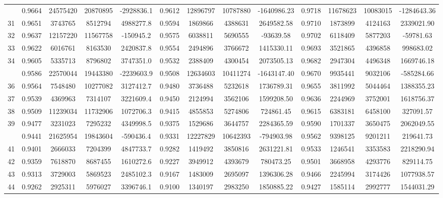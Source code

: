 \documentclass[
  12pt,
]{article}
\begin{document}
\begin{longtable}[t]{lcccccccccccc}
\addlinespace
30 & 0.9664 & 24575420 & 20870895 & -2928836.1 & 0.9612 & 12896797 & 10787880 & -1640986.23 & 0.9718 & 11678623 & 10083015 & -1284643.36\\
31 & 0.9651 & 3743765 & 8512794 & 4988277.8 & 0.9594 & 1869866 & 4388631 & 2649582.58 & 0.9710 & 1873899 & 4124163 & 2339021.90\\
32 & 0.9637 & 12157220 & 11567758 & -150945.2 & 0.9575 & 6038811 & 5690555 & -93639.58 & 0.9702 & 6118409 & 5877203 & -59781.63\\
33 & 0.9622 & 6016761 & 8163530 & 2420837.8 & 0.9554 & 2494896 & 3766672 & 1415330.11 & 0.9693 & 3521865 & 4396858 & 998683.02\\
34 & 0.9605 & 5335713 & 8796802 & 3747351.0 & 0.9532 & 2388409 & 4300454 & 2073505.13 & 0.9682 & 2947304 & 4496348 & 1669746.18\\
\addlinespace
35 & 0.9586 & 22570044 & 19443380 & -2239603.9 & 0.9508 & 12634603 & 10411274 & -1643147.40 & 0.9670 & 9935441 & 9032106 & -585284.66\\
36 & 0.9564 & 7548480 & 10277082 & 3127412.7 & 0.9480 & 3736488 & 5232618 & 1736789.31 & 0.9655 & 3811992 & 5044464 & 1388355.23\\
37 & 0.9539 & 4369963 & 7314107 & 3221609.4 & 0.9450 & 2124994 & 3562106 & 1599208.50 & 0.9636 & 2244969 & 3752001 & 1618756.37\\
38 & 0.9509 & 11239034 & 11732906 & 1072706.3 & 0.9415 & 4855853 & 5274806 & 724861.45 & 0.9615 & 6383181 & 6458100 & 327091.57\\
39 & 0.9477 & 3231023 & 7295232 & 4349998.5 & 0.9375 & 1529686 & 3644757 & 2284365.59 & 0.9590 & 1701337 & 3650475 & 2062049.55\\
\addlinespace
40 & 0.9441 & 21625954 & 19843604 & -590436.4 & 0.9331 & 12227829 & 10642393 & -794903.98 & 0.9562 & 9398125 & 9201211 & 219641.73\\
41 & 0.9401 & 2666033 & 7204399 & 4847733.7 & 0.9282 & 1419492 & 3850816 & 2631221.81 & 0.9533 & 1246541 & 3353583 & 2218290.94\\
42 & 0.9359 & 7618870 & 8687455 & 1610272.6 & 0.9227 & 3949912 & 4393679 & 780473.25 & 0.9501 & 3668958 & 4293776 & 829114.75\\
43 & 0.9313 & 3729003 & 5869523 & 2485102.3 & 0.9167 & 1483009 & 2695097 & 1396306.28 & 0.9466 & 2245994 & 3174426 & 1077938.57\\
44 & 0.9262 & 2925311 & 5976027 & 3396746.1 & 0.9100 & 1340197 & 2983250 & 1850885.22 & 0.9427 & 1585114 & 2992777 & 1544031.29\\

\end{longtable}
\end{document}
